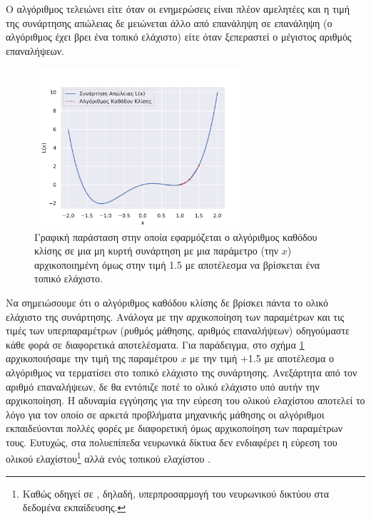 Ο αλγόριθμος τελειώνει είτε όταν οι ενημερώσεις είναι πλέον αμελητέες και η τιμή της συνάρτησης απώλειας δε μειώνεται άλλο από επανάληψη σε επανάληψη (ο αλγόριθμος έχει βρει ένα τοπικό ελάχιστο) είτε όταν ξεπεραστεί ο μέγιστος αριθμός επαναλήψεων.\par

\begin{figure}[h]
  \centering
  \includegraphics[width=0.7\textwidth]{images/chapter theoritical background/gd_init_at_plus1point5.pdf}
  \caption{Γραφική παράσταση στην οποία εφαρμόζεται ο αλγόριθμος καθόδου κλίσης σε μια μη κυρτή συνάρτηση με μια παράμετρο (την $x$) αρχικοποιημένη όμως στην τιμή 1.5 με αποτέλεσμα να βρίσκεται ένα τοπικό ελάχιστο.}
  \label{fig:_gd15}
\end{figure}

Να σημειώσουμε ότι ο αλγόριθμος καθόδου κλίσης δε βρίσκει πάντα το ολικό ελάχιστο της συνάρτησης. Ανάλογα με την αρχικοποίηση των παραμέτρων και τις τιμές των υπερπαραμέτρων (ρυθμός μάθησης, αριθμός επαναλήψεων) οδηγούμαστε κάθε φορά σε διαφορετικά αποτελέσματα. Για παράδειγμα, στο σχήμα \ref{fig:_gd15} αρχικοποιήσαμε την τιμή της παραμέτρου $x$ με την τιμή +1.5 με αποτέλεσμα ο αλγόριθμος να τερματίσει στο τοπικό ελάχιστο της συνάρτησης. Ανεξάρτητα από τον αριθμό επαναλήψεων, δε θα εντόπιζε ποτέ το ολικό ελάχιστο υπό αυτήν την αρχικοποίηση. Η αδυναμία εγγύησης για την εύρεση του ολικού ελαχίστου αποτελεί το λόγο για τον οποίο σε αρκετά προβλήματα μηχανικής μάθησης οι αλγόριθμοι εκπαιδεύονται πολλές φορές με διαφορετική όμως αρχικοποίηση των παραμέτρων τους. Ευτυχώς, στα πολυεπίπεδα νευρωνικά δίκτυα δεν ενδιαφέρει η εύρεση του ολικού ελαχίστου\footnote{Καθώς οδηγεί σε , δηλαδή, υπερπροσαρμογή του νευρωνικού δικτύου στα δεδομένα εκπαίδευσης.} αλλά ενός τοπικού ελαχίστου \cite{choromanska2015loss}.\par

